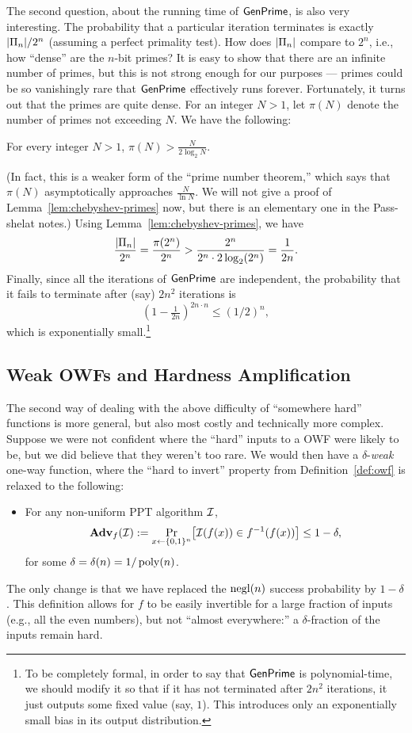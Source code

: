 \documentclass[11pt]{article}
\begin{document}
The second question, about the running time of $\mathsf{GenPrime}$, is
also very interesting.  The probability that a particular iteration
terminates is exactly $\lvert\Pi_{n}\rvert / 2^{n}$ (assuming a perfect
primality test).  How does $\lvert\Pi_{n}\rvert$ compare to $2^{n}$, i.e.,
how ``dense'' are the $n$-bit primes?  It is easy to show that there
are an infinite number of primes, but this is not strong enough for
our purposes --- primes could be so vanishingly rare that
$\mathsf{GenPrime}$ effectively runs forever.  Fortunately, it turns out
that the primes are quite dense.  For an integer $N > 1$, let $\pi(N)$
denote the number of primes not exceeding $N$.  We have the following:

\begin{lemma}[Chebyshev]
  \label{lem:chebyshev-primes}
  For every integer $N > 1$, $\pi(N) > \frac{N}{2 \log_{2} N}$.
\end{lemma}
(In fact, this is a weaker form of the ``prime number theorem,'' which
says that $\pi(N)$ asymptotically approaches $\frac{N}{\ln N}$.  We
will not give a proof of Lemma~\ref{lem:chebyshev-primes} now, but
there is an elementary one in the Pass-shelat notes.)  Using
Lemma~\ref{lem:chebyshev-primes}, we have \[
\frac{\lvert\Pi_{n}\rvert}{2^{n}} = \frac{\pi(2^{n})}{2^{n}} >
\frac{2^{n}}{2^{n} \cdot 2 \log_{2}(2^{n})} = \frac{1}{2n}. \]
Finally, since all the iterations of $\mathsf{GenPrime}$ are
independent, the probability that it fails to terminate after (say)
$2n^{2}$ iterations is \[ (1-\tfrac{1}{2n})^{2n \cdot n} \leq
(1/2)^{n}, \] which is exponentially small.\footnote{To be completely
  formal, in order to say that $\mathsf{GenPrime}$ is polynomial-time,
  we should modify it so that if it has not terminated after $2n^{2}$
  iterations, it just outputs some fixed value (say, $1$).  This
  introduces only an exponentially small bias in its output
  distribution.}

\subsection{Weak OWFs and Hardness Amplification}
\label{sec:hardn-ampl}

The second way of dealing with the above difficulty of ``somewhere
hard'' functions is more general, but also most costly and technically
more complex.  Suppose we were not confident where the ``hard'' inputs
to a OWF were likely to be, but we did believe that they weren't too
rare.  We would then have a $\delta$-\emph{weak} one-way function,
where the ``hard to invert'' property from Definition~\ref{def:owf} is
relaxed to the following:
\begin{itemize}
\item For any non-uniform PPT algorithm $\mathcal{I}$, \[ \advan_{f}(\Inv) :=
  \Pr_{x \gets \bit^{n}} \bracks*{\Inv(f(x)) \in f^{-1}(f(x))} \leq
  1-\delta, \] for some $\delta = \delta(n) = 1/\operatorname{poly}(n)$.
\end{itemize}
The only change is that we have replaced the $\operatorname{negl}(n)$ success
probability by $1-\delta$.  This definition allows for $f$ to be
easily invertible for a large fraction of inputs (e.g., all the even
numbers), but not ``almost everywhere:'' a $\delta$-fraction of the
inputs remain hard.
\end{document}
